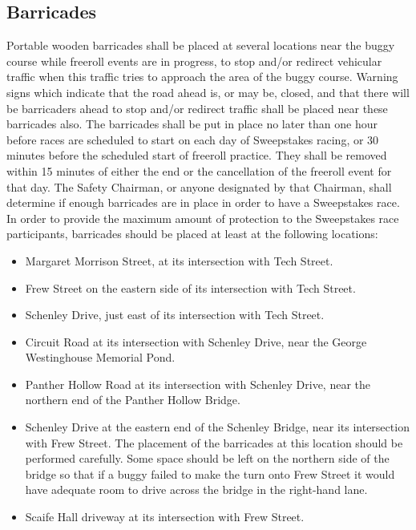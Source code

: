 	
\subsection{Barricades}
\label{subsec:Barricades}

	Portable wooden barricades shall be placed at several locations near the buggy 
	course while freeroll events are in progress, to stop and/or redirect
	vehicular traffic when this traffic tries to approach the area of the buggy
	course. Warning signs which indicate that the road ahead is, or may be, closed,
	and that there will be barricaders ahead to stop and/or redirect traffic shall be
	placed near these barricades also. The barricades shall be put in place no
	later than one hour before races are scheduled to start on each day of
	Sweepstakes racing, or 30 minutes before the scheduled start of freeroll 
	practice. They shall be removed within 15 minutes of either the end or the 
	cancellation of the freeroll event for that day. The
	Safety Chairman, or anyone designated by that Chairman, shall determine if
	enough barricades are in place in order to have a Sweepstakes race. In order to
	provide the maximum amount of protection to the Sweepstakes race participants,
	barricades should be placed at least at the following locations:

	\begin{itemize}

		\item Margaret Morrison Street, at its intersection with Tech Street.

		\item Frew Street on the eastern side of its intersection with Tech
		Street.

		\item Schenley Drive, just east of its intersection with Tech Street.

		\item Circuit Road at its intersection with Schenley Drive, near the
		George Westinghouse Memorial Pond.

		\item Panther Hollow Road at its intersection with Schenley Drive, near
		the northern end of the Panther Hollow Bridge.

		\item Schenley Drive at the eastern end of the Schenley Bridge, near its
		intersection with Frew Street. The placement of the barricades at this location
		should be performed carefully. Some space should be left on the northern side
		of the bridge so that if a buggy failed to make the turn onto Frew Street it
		would have adequate room to drive across the bridge in the right-hand lane.

		\item Scaife Hall driveway at its intersection with Frew Street.

	\end{itemize}

